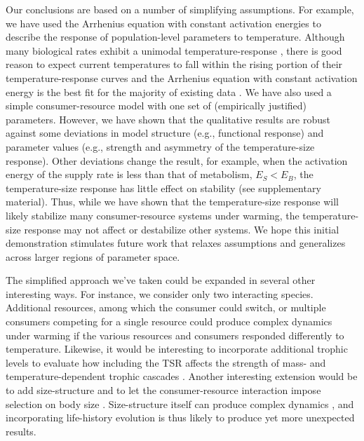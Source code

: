 \documentclass[11pt]{article}
\begin{document}
Our conclusions are based on a number of simplifying assumptions.
For example, we have used the Arrhenius equation with constant activation energies to describe the response of population-level parameters to temperature.
Although many biological rates exhibit a unimodal temperature-response \citep{Angilletta2009,Dell2011}, there is good reason to expect current temperatures to fall within the rising portion of their temperature-response curves \citep{Martin2008} and the Arrhenius equation with constant activation energy is the best fit for the majority of existing data \citep{Pawar2016}.
We have also used a simple consumer-resource model with one set of (empirically justified) parameters.
However, we have shown that the qualitative results are robust against some deviations in model structure (e.g., functional response) and parameter values (e.g., strength and asymmetry of the temperature-size response).
Other deviations change the result, for example, when the activation energy of the supply rate is less than that of metabolism, $E_S < E_B$, the temperature-size response has little effect on stability (see supplementary material).
Thus, while we have shown that the temperature-size response will likely stabilize many consumer-resource systems under warming, the temperature-size response may not affect or destabilize other systems.
We hope this initial demonstration stimulates future work that relaxes assumptions and generalizes across larger regions of parameter space.

The simplified approach we've taken could be expanded in several other interesting ways. 
For instance, we consider only two interacting species. 
Additional resources, among which the consumer could switch, or multiple consumers competing for a single resource could produce complex dynamics under warming if the various resources and consumers responded differently to temperature. 
Likewise, it would be interesting to incorporate additional trophic levels to evaluate how including the TSR affects the strength of mass- and temperature-dependent trophic cascades \citep{DeLong2015}.
Another interesting extension would be to add size-structure and to let the consumer-resource interaction impose selection on 
body size \citep{Abrams1996}.
Size-structure itself can produce complex dynamics \citep{Ohlberger2011}, and incorporating life-history evolution is thus likely to produce yet more unexpected results.
\end{document}
